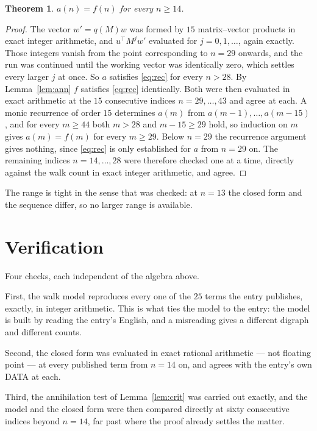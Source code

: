 \documentclass[11pt,a4paper]{article}
\theoremstyle{plain}
\newtheorem{theorem}{Theorem}
\theoremstyle{definition}
\begin{document}
\begin{theorem}
$a(n)=f(n)$ for every $n\ge14$.
\end{theorem}

\begin{proof}
The vector $w'=q(M)w$ was formed by $15$ matrix--vector products in exact integer
arithmetic, and $u^{\!\top}M^{j}w'$ evaluated for $j=0,1,\dots$, again exactly. Those integers
vanish from the point corresponding to $n=29$ onwards, and the run was continued until the
working vector was identically zero, which settles every larger $j$ at once. So $a$ satisfies
\eqref{eq:rec} for every $n>28$. By Lemma~\ref{lem:ann} $f$ satisfies \eqref{eq:rec}
identically. Both were then evaluated in exact arithmetic at the $15$ consecutive indices
$n=29,\dots,43$ and agree at each. A monic recurrence of order $15$
determines $a(m)$ from $a(m-1),\dots,a(m-15)$, and for every $m\ge44$ both
$m>28$ and $m-15\ge29$ hold, so induction on $m$ gives $a(m)=f(m)$ for every
$m\ge29$.
Below $n=29$ the recurrence argument gives nothing, since \eqref{eq:rec} is only
established for $a$ from $n=29$ on. The remaining indices $n=14,\dots,28$ were
therefore checked one at a time, directly against the walk count in exact integer arithmetic,
and agree.
\end{proof}

The range is tight in the sense that was checked: at $n=13$ the closed form and the sequence differ, so no larger range is available.

\section{Verification}

Four checks, each independent of the algebra above.

First, the walk model reproduces every one of the $25$ terms the entry publishes,
exactly, in integer arithmetic. This is what ties the model to the entry: the model is built
by reading the entry's English, and a misreading gives a different digraph and different
counts.

Second, the closed form was evaluated in exact rational arithmetic --- not floating point ---
at every published term from $n=14$ on, and agrees with the entry's own DATA at each.

Third, the annihilation test of Lemma~\ref{lem:crit} was carried out exactly, and the model
and the closed form were then compared directly at sixty consecutive indices beyond
$n=14$, far past where the proof already settles the matter.
\end{document}

